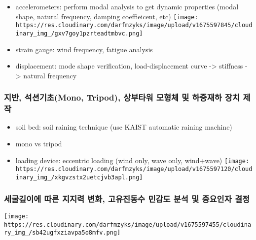 \documentclass[
  letterpaper,
  DIV=11,
  numbers=noendperiod]{scrreprt}
\begin{document}
\begin{itemize}
\item
  accelerometers: perform modal analysis to get dynamic properties
  (modal shape, natural frequency, damping coeffieicent, etc)
  \texttt{[image: https://res.cloudinary.com/darfmzyks/image/upload/v1675597845/cloudinary\_img\_/gxv7goy1pzrteadtmbvc.png]}
\item
  strain gauge: wind frequency, fatigue analysis
\item
  displacement: mode shape verification, load-displacement curve
  -\textgreater{} stiffness -\textgreater{} natural frequency
\end{itemize}

\hypertarget{uxc9c0uxbc18-uxc11duxc158uxae30uxcd08mono-tripod-uxc0c1uxbd80uxd0c0uxc6cc-uxbaa8uxd615uxccb4-uxbc0f-uxd558uxc911uxc7acuxd558-uxc7a5uxce58-uxc81cuxc791}{%
\subsubsection{지반, 석션기초(Mono, Tripod), 상부타워 모형체 및 하중재하
장치
제작}\label{uxc9c0uxbc18-uxc11duxc158uxae30uxcd08mono-tripod-uxc0c1uxbd80uxd0c0uxc6cc-uxbaa8uxd615uxccb4-uxbc0f-uxd558uxc911uxc7acuxd558-uxc7a5uxce58-uxc81cuxc791}}

\begin{itemize}
\item
  soil bed: soil raining technique (use KAIST automatic raining machine)
\item
  mono vs tripod
\item
  loading device: eccentric loading (wind only, wave only, wind+wave)
  \texttt{[image: https://res.cloudinary.com/darfmzyks/image/upload/v1675597120/cloudinary\_img\_/xkgvzstx2uetcjvb3apl.png]}
\end{itemize}

\hypertarget{uxc138uxad74uxae4auxc774uxc5d0-uxb530uxb978-uxc9c0uxc9c0uxb825-uxbcc0uxd654-uxace0uxc720uxc9c4uxb3d9uxc218-uxbbfcuxac10uxb3c4-uxbd84uxc11d-uxbc0f-uxc911uxc694uxc778uxc790-uxacb0uxc815}{%
\subsubsection{세굴깊이에 따른 지지력 변화, 고유진동수 민감도 분석 및
중요인자
결정}\label{uxc138uxad74uxae4auxc774uxc5d0-uxb530uxb978-uxc9c0uxc9c0uxb825-uxbcc0uxd654-uxace0uxc720uxc9c4uxb3d9uxc218-uxbbfcuxac10uxb3c4-uxbd84uxc11d-uxbc0f-uxc911uxc694uxc778uxc790-uxacb0uxc815}}

\texttt{[image: https://res.cloudinary.com/darfmzyks/image/upload/v1675597455/cloudinary\_img\_/sb42ugfxziavpa5o8mfv.png]}
\end{document}
